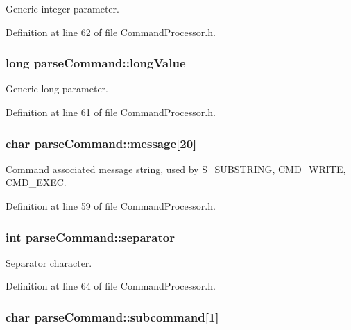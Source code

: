 Generic integer parameter. 



Definition at line 62 of file Command\-Processor.\-h.

\hypertarget{structparse_command_ad062df88615d7d66ded447dd4ff87bad}{
\subsubsection[{long\-Value}]{\setlength{\rightskip}{0pt plus 5cm}long parse\-Command\-::long\-Value}}\label{structparse_command_ad062df88615d7d66ded447dd4ff87bad}


Generic long parameter. 



Definition at line 61 of file Command\-Processor.\-h.

\hypertarget{structparse_command_ab80399acc713a2d31a48dd2db5c7d0a2}{
\subsubsection[{message}]{\setlength{\rightskip}{0pt plus 5cm}char parse\-Command\-::message\mbox{[}20\mbox{]}}}\label{structparse_command_ab80399acc713a2d31a48dd2db5c7d0a2}


Command associated message string, used by S\-\_\-\-S\-U\-B\-S\-T\-R\-I\-N\-G, C\-M\-D\-\_\-\-W\-R\-I\-T\-E, C\-M\-D\-\_\-\-E\-X\-E\-C. 



Definition at line 59 of file Command\-Processor.\-h.

\hypertarget{structparse_command_a5f5c48be92f3aae7c4b1b71ca750298b}{
\subsubsection[{separator}]{\setlength{\rightskip}{0pt plus 5cm}int parse\-Command\-::separator}}\label{structparse_command_a5f5c48be92f3aae7c4b1b71ca750298b}


Separator character. 



Definition at line 64 of file Command\-Processor.\-h.

\hypertarget{structparse_command_a10312bf6b72a9315a4fb550458bc3ae9}{
\subsubsection[{subcommand}]{\setlength{\rightskip}{0pt plus 5cm}char parse\-Command\-::subcommand\mbox{[}1\mbox{]}}}\label{structparse_command_a10312bf6b72a9315a4fb550458bc3ae9}


